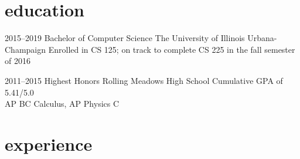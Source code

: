 \documentclass[]{friggeri-cv} %
\begin{document}
\section{education}

\begin{entrylist}


\entry
{2015--2019}
{Bachelor {\normalfont of Computer Science}}
{The University of Illinois Urbana-Champaign}
{Enrolled in CS 125; on track to complete CS 225 in the fall semester of 2016}


\entry
{2011--2015}
{Highest {\normalfont Honors}}
{Rolling Meadows High School}
{Cumulative GPA of 5.41/5.0 \\
AP BC Calculus, AP Physics C}


\end{entrylist}


\section{experience}

\end{document}
